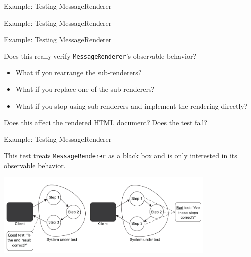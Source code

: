 \documentclass[english,handout,10pt,aspectratio=169,t]{beamer}
\begin{document}
\begin{frame}{Example: Testing MessageRenderer}
  \rendererimpl
\end{frame}

\begin{frame}{Example: Testing MessageRenderer}
  \renderertestone
\end{frame}

\begin{frame}{Example: Testing MessageRenderer}
  \renderertestone

  Does this really verify \texttt{MessageRenderer}'s observable behavior?
  \begin{itemize}
    \item What if you rearrange the sub-renderers?
    \item What if you replace one of the sub-renderers?
    \item What if you stop using sub-renderers and implement the rendering directly?
  \end{itemize}
  Does this affect the rendered HTML document? Does the test fail?
\end{frame}

\begin{frame}{Example: Testing MessageRenderer}
  \renderertesttwo

  This test treats \texttt{MessageRenderer} as a black box and is only interested
  in its observable behavior.
  \begin{center}
    \includegraphics[width=0.8\textwidth]{images/observable_behavior_vs_implementation.png}
  \end{center}
\end{frame}
\end{document}

